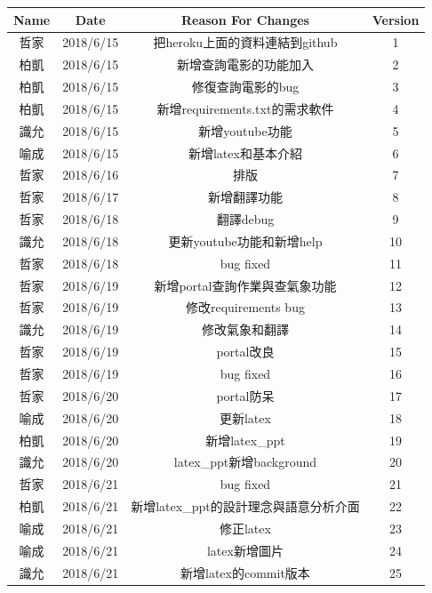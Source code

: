\documentclass{scrreprt}
\begin{document}
\begin{CJK}{UTF8}{bkai}
\begin{center}
    \begin{tabular}{|c|c|c|c|}
        \hline
	    Name & Date & Reason For Changes & Version\\
        \hline        
	    哲家 & 2018/6/15 & 把heroku上面的資料連結到github & 1\\
        \hline        
	    柏凱 & 2018/6/15 & 新增查詢電影的功能加入 & 2\\
        \hline
	    柏凱 & 2018/6/15 & 修復查詢電影的bug & 3\\
        \hline
	    柏凱 & 2018/6/15 & 新增requirements.txt的需求軟件 & 4\\
        \hline
	    識允 & 2018/6/15 & 新增youtube功能 & 5\\
        \hline
	    喻成 & 2018/6/15 & 新增latex和基本介紹 & 6\\
        \hline
	    哲家 & 2018/6/16 & 排版 & 7\\
        \hline
	    哲家 & 2018/6/17 & 新增翻譯功能 & 8\\
        \hline
	    哲家 & 2018/6/18 & 翻譯debug & 9\\
        \hline
	    識允 & 2018/6/18 & 更新youtube功能和新增help & 10\\
        \hline
	    哲家 & 2018/6/18 & bug fixed & 11\\
        \hline
	    哲家 & 2018/6/19 & 新增portal查詢作業與查氣象功能 & 12\\
        \hline
	    哲家 & 2018/6/19 & 修改requirements bug & 13\\
        \hline
	    識允 & 2018/6/19 & 修改氣象和翻譯 & 14\\
        \hline
	    哲家 & 2018/6/19 & portal改良 & 15\\
        \hline
	    哲家 & 2018/6/19 & bug fixed & 16\\
        \hline
	    哲家 & 2018/6/20 & portal防呆 & 17\\
        \hline
	    喻成 & 2018/6/20 & 更新latex & 18\\
        \hline
	    柏凱 & 2018/6/20 & 新增latex_ppt & 19\\
        \hline
	    識允 & 2018/6/20 & latex_ppt新增background & 20\\
        \hline
	    哲家 & 2018/6/21 & bug fixed & 21\\
        \hline
	    柏凱 & 2018/6/21 & 新增latex_ppt的設計理念與語意分析介面 & 22\\
        \hline
	    喻成 & 2018/6/21 & 修正latex & 23\\
        \hline
	    喻成 & 2018/6/21 & latex新增圖片 & 24\\
        \hline
	    識允 & 2018/6/21 & 新增latex的commit版本 & 25\\
        \hline
    \end{tabular}
\end{center}


\end{CJK}
\end{document}
